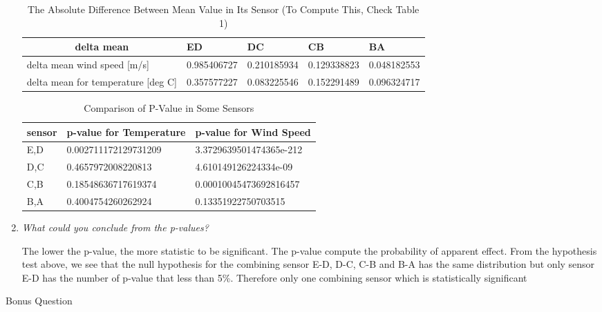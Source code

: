 \documentclass[a4paper,12pt]{article} %
\begin{document}
\begin{enumerate}
\begin{table}[H]
\centering
\begin{tabular}{|l|l|l|l|l|}
\hline
\multicolumn{1}{|c|}{delta mean}       & ED          & DC          & CB          & BA          \\ \hline
delta mean wind speed {[}m/s{]}        & 0.985406727 & 0.210185934 & 0.129338823 & 0.048182553 \\ \hline
delta mean for temperature {[}deg C{]} & 0.357577227 & 0.083225546 & 0.152291489 & 0.096324717 \\ \hline
\end{tabular}
\caption{\label{tab:table-name} The Absolute Difference Between Mean Value in Its Sensor (To Compute This, Check Table 1)}
\end{table}
\begin{table}[H]
\centering
\begin{tabular}{|l|l|l|}
\hline
sensor & p-value for Temperature & p-value for Wind Speed  \\ \hline
E,D    & 0.002711172129731209    & 3.3729639501474365e-212 \\ \hline
D,C    & 0.4657972008220813      & 4.610149126224334e-09   \\ \hline
C,B    & 0.18548636717619374     & 0.00010045473692816457  \\ \hline
B,A    & 0.4004754260262924      & 0.13351922750703515     \\ \hline
\end{tabular}
\caption{\label{tab:table-name} Comparison of P-Value in Some Sensors}
\end{table}
\item {\it What could you conclude from the p-values?}

The lower the p-value, the more statistic to be significant. The p-value compute the probability of apparent effect. From the hypothesis test above, we see that the null hypothesis for the combining sensor E-D, D-C, C-B and B-A has the same distribution but only sensor E-D has the number of p-value that less than 5\%. Therefore only one combining sensor which is statistically significant

\end{enumerate}

\begin{flushleft}
\Large{Bonus Question}
\end{flushleft}
\end{document}
